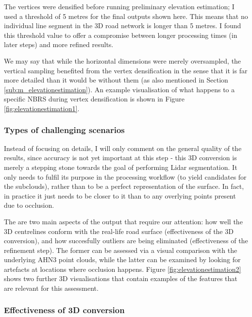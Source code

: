 The vertices were densified before running preliminary elevation estimation; I used a threshold of 5 metres for the final outputs shown here. This means that no individual line segment in the 3D road network is longer than 5 metres. I found this threshold value to offer a compromise between longer processing times (in later steps) and more refined results.

We may say that while the horizontal dimensions were merely oversampled, the vertical sampling benefited from the vertex densification in the sense that it is far more detailed than it would be without them (as also mentioned in Section \ref{sub:m_elevationestimation}). An example visualisation of what happens to a specific NBRS during vertex densification is shown in Figure \ref{fig:elevationestimation1}.

\subsubsection{Types of challenging scenarios}

Instead of focusing on details, I will only comment on the general quality of the results, since accuracy is not yet important at this step - this 3D conversion is merely a stepping stone towards the goal of performing Lidar segmentation. It only needs to fulfil its purpose in the processing workflow (to yield candidates for the subclouds), rather than to be a perfect representation of the surface. In fact, in practice it just needs to be closer to it than to any overlying points present due to occlusion.

The are two main aspects of the output that require our attention: how well the 3D centrelines conform with the real-life road surface (effectiveness of the 3D conversion), and how succesfully outliers are being eliminated (effectiveness of the refinement step). The former can be assessed via a visual comparison with the underlying AHN3 point clouds, while the latter can be examined by looking for artefacts at locations where occlusion happens. Figure \ref{fig:elevationestimation2} shows two further 3D visualisations that contain examples of the features that are relevant for this assessment.

\subsubsection{Effectiveness of 3D conversion}

